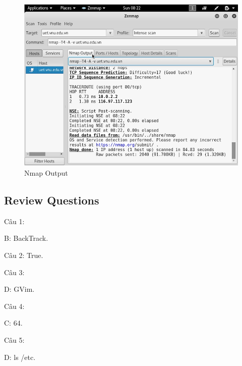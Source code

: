 \begin{figure}[!htb]
    \centering
    \includegraphics[width=0.85\linewidth]{figure//chapter5//lab5_1/nmap-output.png}
    \caption{Nmap Output}
    \label{fig:enter-label}
\end{figure}

\subsection{Review Questions}

\noindent Câu 1: 

B: BackTrack.

\noindent Câu 2: True.

\noindent Câu 3: 

D: GVim.

\noindent Câu 4:

C: 64.

\noindent Câu 5:

D: ls /etc.
